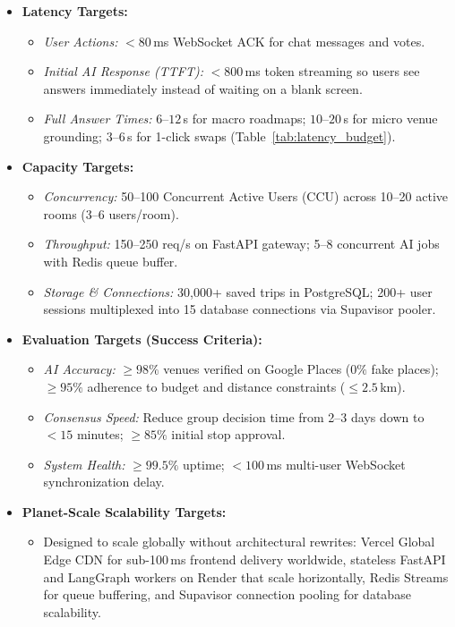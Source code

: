 \documentclass[11pt,a4paper]{article}
\begin{document}
\begin{itemize}[leftmargin=1.2em]
\item \textbf{Latency Targets:}
  \begin{itemize}[leftmargin=1.0em]
  \item \textit{User Actions:} $< 80$\,ms WebSocket ACK for chat messages and votes.
  \item \textit{Initial AI Response (TTFT):} $< 800$\,ms token streaming so users see answers immediately instead of waiting on a blank screen.
  \item \textit{Full Answer Times:} $6$--$12$\,s for macro roadmaps; $10$--$20$\,s for micro venue grounding; $3$--$6$\,s for 1-click swaps (Table~\ref{tab:latency_budget}).
  \end{itemize}
\item \textbf{Capacity Targets:}
  \begin{itemize}[leftmargin=1.0em]
  \item \textit{Concurrency:} 50--100 Concurrent Active Users (CCU) across 10--20 active rooms (3--6 users/room).
  \item \textit{Throughput:} 150--250 req/s on FastAPI gateway; 5--8 concurrent AI jobs with Redis queue buffer.
  \item \textit{Storage \& Connections:} 30,000+ saved trips in PostgreSQL; 200+ user sessions multiplexed into 15 database connections via Supavisor pooler.
  \end{itemize}
\item \textbf{Evaluation Targets (Success Criteria):}
  \begin{itemize}[leftmargin=1.0em]
  \item \textit{AI Accuracy:} $\ge 98\%$ venues verified on Google Places ($0\%$ fake places); $\ge 95\%$ adherence to budget and distance constraints ($\le 2.5$\,km).
  \item \textit{Consensus Speed:} Reduce group decision time from 2--3 days down to $< 15$ minutes; $\ge 85\%$ initial stop approval.
  \item \textit{System Health:} $\ge 99.5\%$ uptime; $< 100$\,ms multi-user WebSocket synchronization delay.
  \end{itemize}
\item \textbf{Planet-Scale Scalability Targets:}
  \begin{itemize}[leftmargin=1.0em]
  \item Designed to scale globally without architectural rewrites: Vercel Global Edge CDN for sub-100\,ms frontend delivery worldwide, stateless FastAPI and LangGraph workers on Render that scale horizontally, Redis Streams for queue buffering, and Supavisor connection pooling for database scalability.
  \end{itemize}
\end{itemize}
\end{document}

